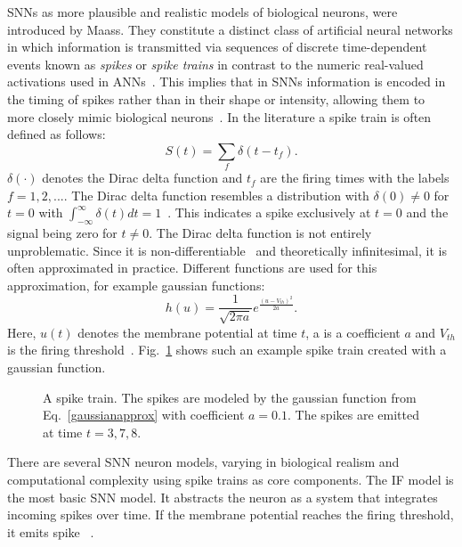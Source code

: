 \acp{SNN} as more plausible and realistic models of biological neurons, were introduced by Maass.
They constitute a distinct class of artificial neural networks in which information is transmitted via sequences of discrete time-dependent events known as \textit{spikes} or \textit{spike trains} in contrast to the numeric real-valued activations used in \acp{ANN}~\cite{maass_networks_1997}.
This implies that in \acp{SNN} information is encoded in the timing of spikes rather than in their shape or intensity, allowing them to more closely mimic biological neurons~\cite{ponulak_introduction_2011, maass_networks_1997}.
In the literature a spike train is often defined as follows:
\begin{equation}
    S(t) = \sum_f \delta(t - t_f).
    \label{diracdelta}
\end{equation}
\( \delta(\cdot) \) denotes the Dirac delta function and \( t_f \) are the firing times with the labels \( f = 1, 2, ... \).
The Dirac delta function resembles a distribution with \( \delta(0) \neq 0\) for \( t = 0 \) with \(\int_{-\infty  }^{\infty}\delta(t)dt = 1\)~\cite{ponulak_introduction_2011}.
This indicates a spike exclusively at \( t = 0 \) and the signal being zero for \( t \neq 0\).
The Dirac delta function is not entirely unproblematic.
Since it is non-differentiable~\cite{tavanaei_deep_2019} and theoretically infinitesimal, it is often approximated in practice.
Different functions are used for this approximation, for example gaussian functions:
\begin{equation}
      h(u)=\frac{1}{\sqrt{2 \pi a}} e^{\frac{(u - V_{th})^2}{2a}}.
      \label{gaussianapprox}
\end{equation}
Here, \(u(t)\) denotes the membrane potential at time \(t\), a is a coefficient \(a\) and \(V_{th}\) is the firing threshold~\cite{wu_spatio-temporal_2018}.
Fig.~\ref{fig:spiketrain} shows such an example spike train created with a gaussian function.
\begin{figure}
    \centering
    
    \caption[A spike train.]{A spike train. The spikes are modeled by the gaussian function from Eq.~\ref{gaussianapprox} with coefficient \(a=0.1\). The spikes are emitted at time \( t=3,7,8 \).}
    \label{fig:spiketrain}
\end{figure}

There are several \ac{SNN} neuron models, varying in biological realism and computational complexity using spike trains as core components.
The \ac{IF} model is the most basic \ac{SNN} model.
It abstracts the neuron as a system that integrates incoming spikes over time.
If the membrane potential reaches the firing threshold, it emits spike ~\cite{pietrzak_overview_2023, nunes_spiking_2022}.

